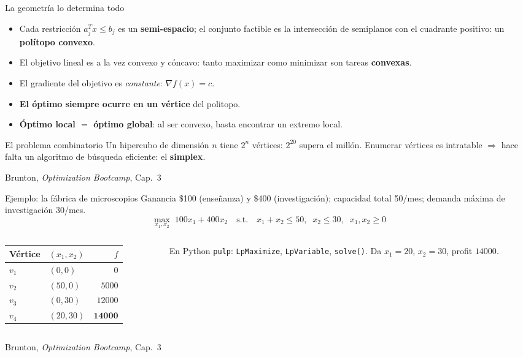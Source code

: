\documentclass[10pt,aspectratio=169]{beamer}
\newcommand{\fuente}{\vfill{\scriptsize\color{gray}Brunton, \emph{Optimization Bootcamp}, Cap.~3}}
\begin{document}
\begin{frame}{La geometría lo determina todo}
  \small
  \begin{itemize}
    \item Cada restricción $a_j^T x \le b_j$ es un \textbf{semi-espacio}; el conjunto
      factible es la intersección de semiplanos con el cuadrante positivo:
      un \textbf{polítopo convexo}.
    \item El objetivo lineal es a la vez convexo y cóncavo: tanto maximizar como
      minimizar son tareas \textbf{convexas}.
    \item El gradiente del objetivo es \emph{constante}: $\nabla f(x) = c$.
    \item \textbf{El óptimo siempre ocurre en un vértice} del politopo.
    \item \textbf{Óptimo local $=$ óptimo global}: al ser convexo, basta encontrar un
      extremo local.
  \end{itemize}
  \begin{alertblock}{El problema combinatorio}
    Un hipercubo de dimensión $n$ tiene $2^n$ vértices: $2^{20}$ supera el millón.
    Enumerar vértices es intratable $\Rightarrow$ hace falta un algoritmo de búsqueda
    eficiente: el \textbf{simplex}.
  \end{alertblock}
  \fuente
\end{frame}

\begin{frame}{Ejemplo: la fábrica de microscopios}
  \small
  Ganancia \$100 (enseñanza) y \$400 (investigación); capacidad total 50/mes;
  demanda máxima de investigación 30/mes.
  \[
    \max_{x_1,x_2}\; 100 x_1 + 400 x_2 \quad \text{s.t.}\quad
    x_1+x_2 \le 50,\;\; x_2 \le 30,\;\; x_1,x_2 \ge 0
  \]
  \begin{columns}[T,onlytextwidth]
    \begin{column}{.46\textwidth}
      \small
      \begin{tabularx}{\textwidth}{@{}l l r@{}}
        \toprule
        Vértice & $(x_1,x_2)$ & $f$ \\
        \midrule
        $v_1$ & $(0,0)$   & $0$ \\
        $v_2$ & $(50,0)$  & $5000$ \\
        $v_3$ & $(0,30)$  & $12000$ \\
        $v_4$ & $(20,30)$ & $\mathbf{14000}$ \\
        \bottomrule
      \end{tabularx}
    \end{column}
    \begin{column}{.5\textwidth}
      \small
      \begin{block}{En Python}
        \small
        \texttt{pulp}: \texttt{LpMaximize}, \texttt{LpVariable}, \texttt{solve()}.
        \medskip
        Da $x_1 = 20$, $x_2 = 30$, profit $14000$.
      \end{block}
    \end{column}
  \end{columns}
  \fuente
\end{frame}
\end{document}
